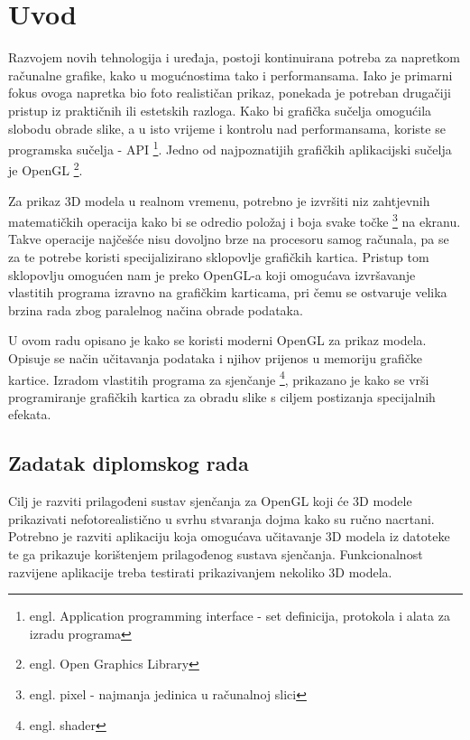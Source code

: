 \section{Uvod}

Razvojem novih tehnologija i uređaja, postoji kontinuirana potreba za napretkom računalne grafike, kako u mogućnostima tako i performansama. Iako je primarni fokus ovoga napretka bio foto realističan prikaz, ponekada je potreban drugačiji pristup iz praktičnih ili estetskih razloga. Kako bi grafička sučelja omogućila slobodu obrade slike, a u isto vrijeme i kontrolu nad performansama, koriste se programska sučelja - API \footnote{engl. Application programming interface - set definicija, protokola i alata za izradu programa}. Jedno od najpoznatijih grafičkih aplikacijski sučelja je OpenGL \footnote{engl. Open Graphics Library}.

Za prikaz 3D modela u realnom vremenu, potrebno je izvršiti niz zahtjevnih matematičkih operacija kako bi se odredio položaj i boja svake točke \footnote{engl. pixel - najmanja jedinica u računalnoj slici} na ekranu. Takve operacije najčešće nisu dovoljno brze na procesoru samog računala, pa se za te potrebe koristi specijalizirano sklopovlje grafičkih kartica. Pristup tom sklopovlju omogućen nam je preko OpenGL-a koji omogućava izvršavanje vlastitih programa izravno na grafičkim karticama, pri čemu se ostvaruje velika brzina rada zbog paralelnog načina obrade podataka.

U ovom radu opisano je kako se koristi moderni OpenGL za prikaz modela. Opisuje se način učitavanja podataka i njihov prijenos u memoriju grafičke kartice. Izradom vlastitih programa za sjenčanje \footnote{engl. shader}, prikazano je kako se vrši programiranje grafičkih kartica za obradu slike s ciljem postizanja specijalnih efekata.

\subsection{Zadatak diplomskog rada}

Cilj je razviti prilagođeni sustav sjenčanja za OpenGL koji će 3D modele prikazivati nefotorealistično u svrhu stvaranja dojma kako su ručno nacrtani. Potrebno je razviti aplikaciju koja omogućava učitavanje  3D modela iz datoteke te ga prikazuje korištenjem prilagođenog sustava sjenčanja. Funkcionalnost razvijene aplikacije treba testirati prikazivanjem nekoliko 3D modela.
